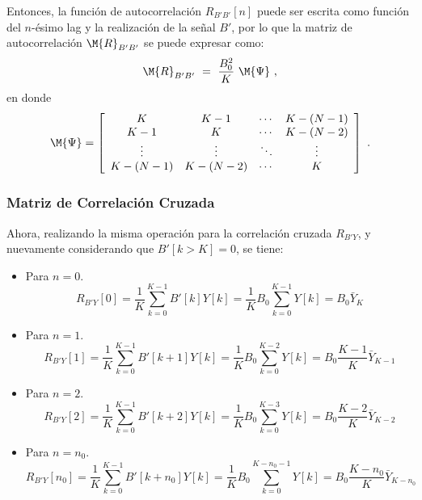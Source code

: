 Entonces, la función de autocorrelación $R_{B'B'}[n]$ puede ser escrita como función del $n$-ésimo lag y la realización de la señal $B'$, por lo que la matriz de autocorrelación $\M{R}_{B'B'}$ se puede expresar como:
\begin{equation}
 \M{R}_{B'B'}~=~\frac{B_0^2}{K} ~\M{\Psi}~,
\end{equation}
en donde
\begin{equation}
 \M{\Psi} = \left[\begin{array}{cccc}
 K & K-1 & \cdots & K-(N-1)\\
 K-1 & K & \cdots & K-(N-2)\\
 \vdots & \vdots & \ddots & \vdots \\
 K-(N-1) & K-(N-2) & \cdots & K 
\end{array}\right]~. \label{Eq:Psi}
\end{equation}

\subsubsection{Matriz de Correlación Cruzada}
Ahora, realizando la misma operación para la correlación cruzada $R_{B'Y}$, y nuevamente considerando que $B'[k>K]=0$, se tiene:
\begin{itemize}
\item Para $n=0$.
$$R_{B'Y}[0] = \frac{1}{K}\sum_{k=0}^{K-1}B'[k]Y[k]
= \frac{1}{K}B_0\sum_{k=0}^{K-1}Y[k]
= B_0\bar{Y}_K$$

\item Para $n=1$.
$$R_{B'Y}[1] = \frac{1}{K}\sum_{k=0}^{K-1}B'[k+1]Y[k]
= \frac{1}{K}B_0\sum_{k=0}^{K-2}Y[k]
= B_0 \frac{K-1}{K} \bar{Y}_{K-1}$$

\item Para $n=2$.
$$R_{B'Y}[2] = \frac{1}{K}\sum_{k=0}^{K-1}B'[k+2]Y[k]
= \frac{1}{K}B_0\sum_{k=0}^{K-3}Y[k]
= B_0 \frac{K-2}{K} \bar{Y}_{K-2}$$

\item Para $n=n_0$.
$$R_{B'Y}[n_0] = \frac{1}{K}\sum_{k=0}^{K-1}B'[k+n_0]Y[k]
= \frac{1}{K}B_0\sum_{k=0}^{K-n_0-1}Y[k]
= B_0 \frac{K-n_0}{K} \bar{Y}_{K-n_0}$$
\end{itemize}

